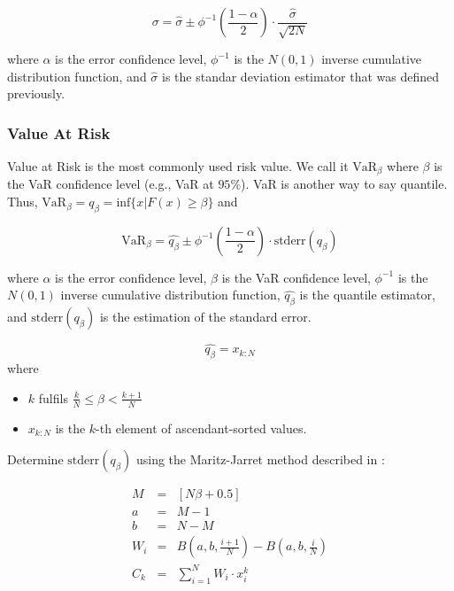 \documentclass[a4paper,12pt,final]{article}
\begin{document}
\begin{displaymath}
\sigma = \widehat{\sigma} \pm \phi^{-1}\left(\frac{1-\alpha}{2}\right) \cdot \frac{\widehat{\sigma}}{\sqrt{2N}}
\end{displaymath}

where $\alpha$ is the error confidence level, $\phi^{-1}$ is the $N(0,1)$ inverse 
cumulative distribution function, and $\widehat{\sigma}$ is the standar deviation 
estimator that was defined previously.

\subsubsection{Value At Risk}
Value at Risk \cite{var:jorion} is the most commonly used risk value. We call it 
$\textrm{VaR}_{\beta}$ where $\beta$ is the VaR confidence level (e.g., VaR at $95\%$).
VaR is another way to say quantile. Thus,
$\textrm{VaR}_{\beta} = q_{\beta} = \textrm{inf}\{x | F(x) \geq \beta \}$ and

\begin{displaymath}
\textrm{VaR}_{\beta} = \widehat{q_{\beta}} \pm \phi^{-1}\left(\frac{1-\alpha}{2}\right) \cdot \textrm{stderr}(q_{\beta})
\end{displaymath}

where $\alpha$ is the error confidence level, $\beta$ is the VaR confidence 
level, $\phi^{-1}$ is the $N(0,1)$ inverse cumulative distribution function, 
$\widehat{q_{\beta}}$ is the quantile estimator, and $\textrm{stderr}(q_{\beta})$
is the estimation of the standard error.

\begin{displaymath}
\widehat{q_{\beta}} = x_{k:N}
\end{displaymath}
where
\begin{itemize}
\item $k$ fulfils $\frac{k}{N} \leq \beta < \frac{k+1}{N}$
\item $x_{k:N}$ is the $k$-th element of ascendant-sorted values.
\end{itemize}

Determine $\textrm{stderr}(q_{\beta})$ using the Maritz-Jarret method described
in \cite{quant:algor}:

\begin{displaymath}
\begin{array}{rcl}
M   & = & [N \beta + 0.5]  \\
a   & = & M - 1            \\
b   & = & N - M            \\
W_i & = & B(a,b,\frac{i+1}{N}) - B(a,b,\frac{i}{N}) \\
C_k & = & \sum_{i=1}^{N} W_i \cdot x_i^k \\
\end{array}
\end{displaymath}
\end{document}
